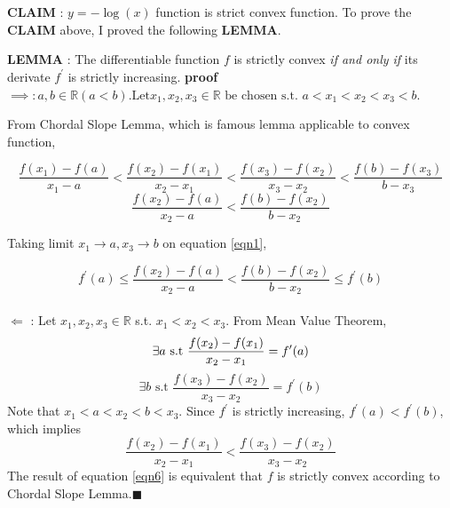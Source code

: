 \documentclass[10pt]{article}
\begin{document}
\section{}
\textbf{CLAIM} : $y = -\log(x)$ function is strict convex function. 
To prove the \textbf{CLAIM} above, I proved the following \textbf{LEMMA}.


\textbf{LEMMA} : The differentiable function $f$ is strictly convex \textit{if and only if} its derivate $f^\prime$ is strictly increasing.
\textbf{proof}\\
$\implies :     a,b \in \mathbb{R} (a<b). \text{Let} x_1, x_2, x_3 \in \mathbb{R} \text{ be chosen s.t. } a<x_1<x_2<x_3<b.$

From Chordal Slope Lemma, which is famous lemma applicable to convex function,

\begin{equation}
    \frac{f(x_1) - f(a)}{x_1 - a} < \frac{f(x_2) - f(x_1)}{x_2 - x_1}<\frac{f(x_3) - f(x_2)}{x_3 - x_2} < \frac{f(b) - f(x_3)}{b - x_3}
    \label{eqn1}
\end{equation} 
\begin{equation}
    \frac{f(x_2) - f(a)}{x_2 - a} < \frac{f(b) - f(x_2)}{b - x_2}
\end{equation} 

Taking limit $x_1 \rightarrow a, x_3 \rightarrow b$ on equation \ref{eqn1}, 

\begin{equation}
    f^\prime(a) \le \frac{f(x_2) - f(a)}{x_2 - a} < \frac{f(b) - f(x_2)}{b - x_2} \le f^\prime(b)
\end{equation}\\
$\Longleftarrow$ : Let $x_1, x_2, x_3 \in \mathbb{R}$ s.t. $x_1<x_2<x_3$. From Mean Value Theorem,
\begin{equation}
    \exists a \text{ s.t } \frac{f(x_2) - f(x_1)}{x_2 - x_1} = f^\prime(a) \\
\end{equation}
\begin{equation}
    \exists b \text{ s.t } \frac{f(x_3) - f(x_2)}{x_3 - x_2} = f^\prime(b)
\end{equation}
Note that $x_1<a<x_2<b<x_3$. Since $f^\prime$ is strictly increasing, $f^\prime(a) < f^\prime(b)$, which implies 
\begin{equation}
    \frac{f(x_2) - f(x_1)}{x_2 - x_1} < \frac{f(x_3) - f(x_2)}{x_3 - x_2} 
    \label{eqn6}
\end{equation}
The result of equation \ref{eqn6} is equivalent that $f$ is strictly convex according to Chordal Slope Lemma.$\blacksquare$ 
\end{document}
